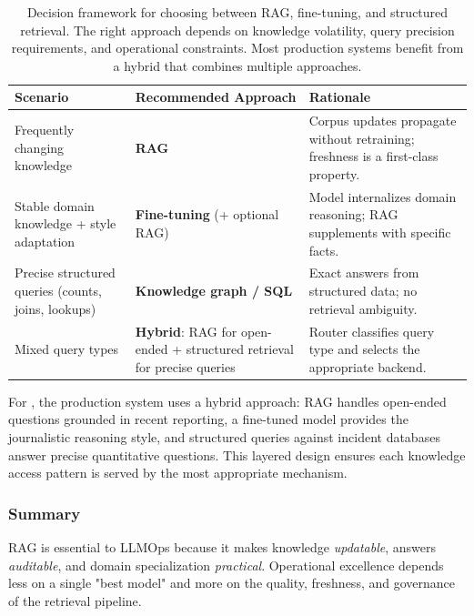 \begin{table}[t]
\centering
\small
\caption{Decision framework for choosing between RAG, fine-tuning, and structured retrieval. The right approach depends on knowledge volatility, query precision requirements, and operational constraints. Most production systems benefit from a hybrid that combines multiple approaches.}
\label{tab:ch08_rag_alternatives}
\setlength{\tabcolsep}{6pt}
\renewcommand{\arraystretch}{1.3}
\begin{tabularx}{0.95\linewidth}{@{}>{\raggedright\arraybackslash}p{3.2cm}>{\raggedright\arraybackslash}X>{\raggedright\arraybackslash}X@{}}
\toprule
\rowcolor{gray!15}
\textbf{Scenario} & \textbf{Recommended Approach} & \textbf{Rationale} \\
\midrule
\rowcolor{blue!8}
Frequently changing knowledge & \textbf{RAG} & Corpus updates propagate without retraining; freshness is a first-class property. \\
\rowcolor{green!10}
Stable domain knowledge + style adaptation & \textbf{Fine-tuning} (+ optional RAG) & Model internalizes domain reasoning; RAG supplements with specific facts. \\
\rowcolor{orange!10}
Precise structured queries (counts, joins, lookups) & \textbf{Knowledge graph / SQL} & Exact answers from structured data; no retrieval ambiguity. \\
\rowcolor{cyan!10}
Mixed query types & \textbf{Hybrid}: RAG for open-ended + structured retrieval for precise queries & Router classifies query type and selects the appropriate backend. \\
\bottomrule
\end{tabularx}
\end{table}

\noindent For \ishtar{}, the production system uses a hybrid approach: RAG handles open-ended questions grounded in recent reporting, a fine-tuned model provides the journalistic reasoning style, and structured queries against incident databases answer precise quantitative questions. This layered design ensures each knowledge access pattern is served by the most appropriate mechanism.

\subsubsection*{Summary}
RAG is essential to LLMOps because it makes knowledge \emph{updatable}, answers \emph{auditable}, and domain specialization \emph{practical}. Operational excellence depends less on a single "best model" and more on the quality, freshness, and governance of the retrieval pipeline.


